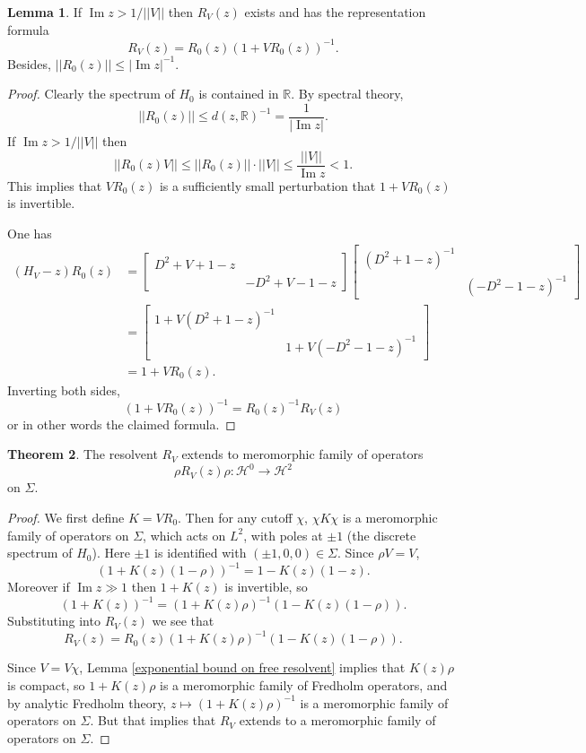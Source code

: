 \documentclass[12pt]{report}
\newcommand{\RR}{\mathbb{R}}
\renewcommand{\Im}{\operatorname{Im}}
\theoremstyle{definition}
\newtheorem{theorem}{Theorem}[chapter]
\newtheorem{lemma}[theorem]{Lemma}
\begin{document}
\begin{lemma}
If $\Im z > 1/||V||$ then $R_V(z)$ exists and has the representation formula
$$R_V(z) = R_0(z)(1 + VR_0(z))^{-1}.$$
Besides, $||R_0(z)|| \leq |\Im z|^{-1}$.
\end{lemma}
\begin{proof}
Clearly the spectrum of $H_0$ is contained in $\RR$.
By spectral theory,
$$||R_0(z)|| \leq d(z, \RR)^{-1} = \frac{1}{|\Im z|}.$$
If $\Im z > 1/||V||$ then
$$||R_0(z)V|| \leq ||R_0(z)||\cdot ||V|| \leq \frac{||V||}{\Im z} < 1.$$
This implies that $VR_0(z)$ is a sufficiently small perturbation that $1 + VR_0(z)$ is invertible.

One has
\begin{align*}(H_V - z)R_0(z) &= \begin{bmatrix}D^2 + V + 1 - z\\& -D^2 + V - 1 - z\end{bmatrix}\begin{bmatrix}(D^2 + 1 - z)^{-1}\\&(-D^2-1-z)^{-1}\end{bmatrix}\\
 &= \begin{bmatrix}1 + V(D^2 + 1 - z)^{-1}\\&1 + V(-D^2 - 1 - z)^{-1}\end{bmatrix}
 \\& = 1 + VR_0(z).
 \end{align*}
Inverting both sides,
$$(1 + VR_0(z))^{-1} = R_0(z)^{-1}R_V(z)$$
or in other words the claimed formula.
\end{proof}

\begin{theorem}
The resolvent $R_V$ extends to meromorphic family of operators
$$\rho R_V(z) \rho: \mathcal H^0 \to \mathcal H^2$$
on $\Sigma$.
\end{theorem}
\begin{proof}
We first define $K = VR_0$.
Then for any cutoff $\chi$, $\chi K \chi$ is a meromorphic family of operators on $\Sigma$, which acts on $L^2$, with poles at $\pm 1$ (the discrete spectrum of $H_0$). Here $\pm 1$ is identified with $(\pm 1, 0, 0) \in \Sigma$.
Since $\rho V = V$,
$$(1 + K(z)(1-\rho))^{-1} = 1 - K(z)(1 - z).$$
Moreover if $\Im z \gg 1$ then $1 + K(z)$ is invertible, so
$$(1 + K(z))^{-1} = (1 + K(z)\rho)^{-1}(1 - K(z)(1 - \rho)).$$
Substituting into $R_V(z)$ we see that
$$R_V(z) = R_0(z)(1 + K(z)\rho)^{-1}(1 - K(z)(1 - \rho)).$$

Since $V = V\chi$, Lemma \ref{exponential bound on free resolvent} implies that $K(z)\rho$ is compact, so $1 + K(z)\rho$ is a meromorphic family of Fredholm operators, and by analytic Fredholm theory, $z \mapsto (1 + K(z)\rho)^{-1}$ is a meromorphic family of operators on $\Sigma$.
But that implies that $R_V$ extends to a meromorphic family of operators on $\Sigma$.
\end{proof}
\end{document}
